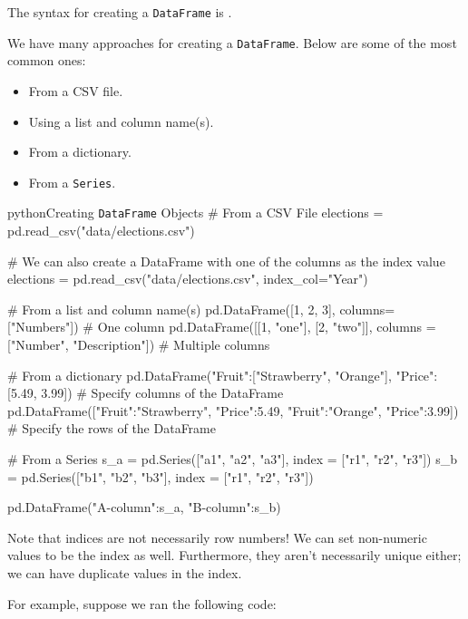 \documentclass[openany]{book}
\begin{document}
The syntax for creating a \texttt{DataFrame} is .

We have many approaches for creating a \texttt{DataFrame}. Below are some of the most common ones:
\begin{itemize}
	\item From a CSV file.
	\item Using a list and column name(s).
	\item From a dictionary.
	\item From a \texttt{Series}.
\end{itemize}

\begin{code}{python}{Creating \texttt{DataFrame} Objects}
# From a CSV File
elections = pd.read_csv("data/elections.csv")

# We can also create a DataFrame with one of the columns as the index value
elections = pd.read_csv("data/elections.csv", index_col="Year")

# From a list and column name(s)
pd.DataFrame([1, 2, 3], columns=["Numbers"]) # One column
pd.DataFrame([[1, "one"], [2, "two"]], columns = ["Number", "Description"]) # Multiple columns

# From a dictionary
pd.DataFrame({"Fruit":["Strawberry", "Orange"], "Price": [5.49, 3.99]}) # Specify columns of the DataFrame
pd.DataFrame([{"Fruit":"Strawberry", "Price":5.49}, {"Fruit":"Orange", "Price":3.99}]) # Specify the rows of the DataFrame

# From a Series
s_a = pd.Series(["a1", "a2", "a3"], index = ["r1", "r2", "r3"])
s_b = pd.Series(["b1", "b2", "b3"], index = ["r1", "r2", "r3"])

pd.DataFrame({"A-column":s_a, "B-column":s_b})
\end{code}

\begin{warn}
	Note that indices are not necessarily row numbers! We can set non-numeric values to be the index as well. Furthermore, they aren't necessarily unique either; we can have duplicate values in the index. 
\end{warn}

For example, suppose we ran the following code: 

\begin{center}
\end{center}
\end{document}
